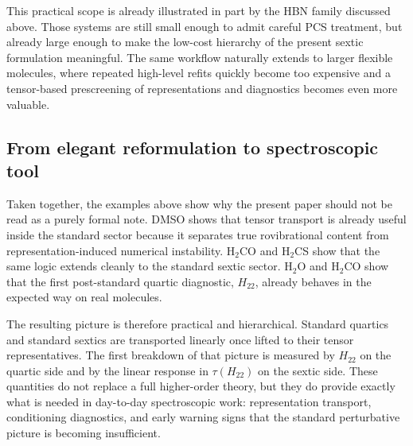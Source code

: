 This practical scope is already illustrated in part by the HBN family
discussed above. Those systems are still small enough to admit careful PCS
treatment, but already large enough to make the low-cost hierarchy of the
present sextic formulation meaningful. The same workflow naturally extends to
larger flexible molecules, where repeated high-level refits quickly become
too expensive and a tensor-based prescreening of representations and
diagnostics becomes even more valuable.

\subsection{From elegant reformulation to spectroscopic tool}

Taken together, the examples above show why the present paper should not be
read as a purely formal note. DMSO shows that tensor transport is already
useful inside the standard sector because it separates true rovibrational
content from representation-induced numerical instability. H$_2$CO and
H$_2$CS show that the same logic extends cleanly to the standard sextic
sector. H$_2$O and H$_2$CO show that the first post-standard quartic
diagnostic, $H_{22}$, already behaves in the expected way on real molecules.

The resulting picture is therefore practical and hierarchical. Standard
quartics and standard sextics are transported linearly once lifted to their
tensor representatives. The first breakdown of that picture is measured by
$H_{22}$ on the quartic side and by the linear response in $\tau(H_{22})$ on
the sextic side. These quantities do not replace a full higher-order theory,
but they do provide exactly what is needed in day-to-day spectroscopic work:
representation transport, conditioning diagnostics, and early warning signs
that the standard perturbative picture is becoming insufficient.
